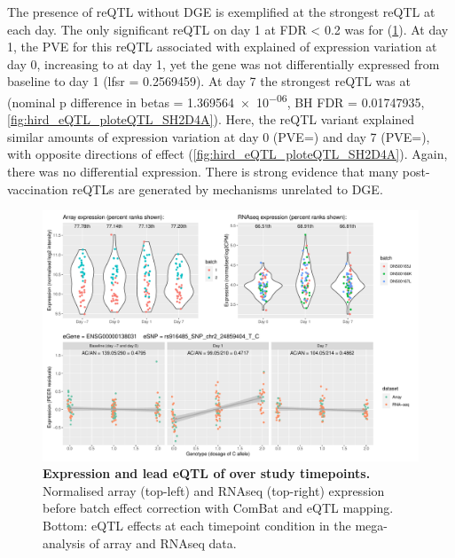 The presence of \gls{reQTL} without \gls{DGE} is exemplified at the strongest
\gls{reQTL} at each day.
The only significant \gls{reQTL} on day 1 at FDR < 0.2 was for  (\cref{fig:hird_eQTL_ploteQTL_ADCY3}).
At day 1, the \gls{PVE} for this \gls{reQTL} associated with  explained  of expression variation at day 0, increasing to  at day 1,
yet the gene was not differentially expressed from baseline to day 1 (lfsr = \num{0.2569459}).
%
At day 7 the strongest \gls{reQTL} was at  (nominal p difference in betas = \num{1.369564e-06}, BH FDR = \num{0.01747935}, \cref{fig:hird_eQTL_ploteQTL_SH2D4A}).
Here, the \gls{reQTL} variant explained similar amounts of expression variation at day 0 (\gls{PVE}=) and day 7 (\gls{PVE}=), with opposite directions of effect (\cref{fig:hird_eQTL_ploteQTL_SH2D4A}).
Again, there was no differential expression.
There is strong evidence that many post-vaccination \glspl{reQTL} are generated by mechanisms unrelated to \gls{DGE}.

\begin{figure}
    \centering
    \includegraphics[width=1.0\textwidth,page=1]{mainmatter/figures/chapter_03/plot_dge_eqtl_genotypes.ENSG00000138031,rs916485_SNP_chr2_24859404_T_C.pdf}
    \caption{
        \textbf{Expression and lead \gls{eQTL} of  over study timepoints.}
        Normalised array (top-left) and \gls{RNAseq} (top-right) expression before batch effect correction with ComBat and \gls{eQTL} mapping. 
        Bottom: \gls{eQTL} effects at each timepoint condition in the mega-analysis of array and \gls{RNAseq} data.
    }
    \label{fig:hird_eQTL_ploteQTL_ADCY3}
\end{figure}

